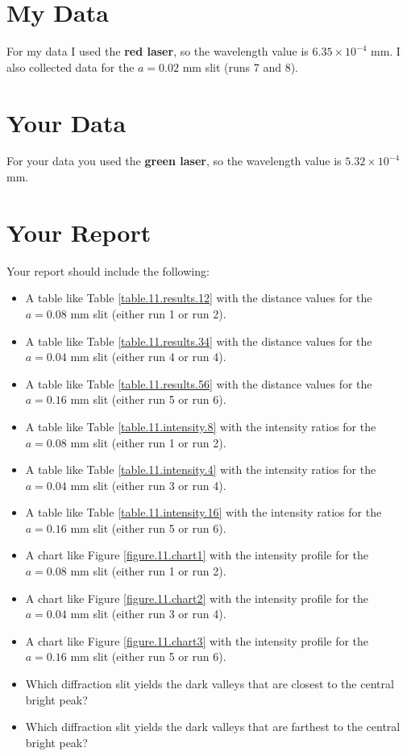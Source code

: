 \section{My Data}
%
For my data I used the \textbf{red laser}, so the wavelength value is $6.35 \times 10^{-4}$ mm. I also collected data for the $a = 0.02$ mm slit (runs 7 and 8).
%
\section{Your Data}
%
For your data you used the \textbf{green laser}, so the wavelength value is $5.32 \times 10^{-4}$ mm.
%
\newpage
\section{Your Report}
%
Your report should include the following:
\begin{itemize}
    \item A table like Table \ref{table.11.results.12} with the distance values for the $a = 0.08$ mm slit (either run 1 or run 2).
    \item A table like Table \ref{table.11.results.34} with the distance values for the $a = 0.04$ mm slit (either run 4 or run 4).
    \item A table like Table \ref{table.11.results.56} with the distance values for the $a = 0.16$ mm slit (either run 5 or run 6).
    \item A table like Table \ref{table.11.intensity.8} with the intensity ratios for the $a = 0.08$ mm slit (either run 1 or run 2).
    \item A table like Table \ref{table.11.intensity.4} with the intensity ratios for the $a = 0.04$ mm slit (either run 3 or run 4).
    \item A table like Table \ref{table.11.intensity.16} with the intensity ratios for the $a = 0.16$ mm slit (either run 5 or run 6).
    \item A chart like Figure \ref{figure.11.chart1} with the intensity profile for the $a = 0.08$ mm slit (either run 1 or run 2).
    \item A chart like Figure \ref{figure.11.chart2} with the intensity profile for the $a = 0.04$ mm slit (either run 3 or run 4).
    \item A chart like Figure \ref{figure.11.chart3} with the intensity profile for the $a = 0.16$ mm slit (either run 5 or run 6).
    \item Which diffraction slit yields the dark valleys that are closest to the central bright peak?
    \item Which diffraction slit yields the dark valleys that are farthest to the central bright peak?
\end{itemize}
%
\newpage
